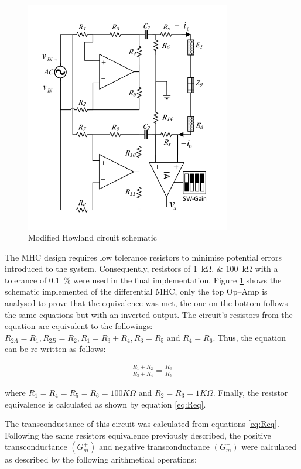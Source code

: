 \begin{figure}[!htpb]
	\centering
	\includegraphics[width=9cm,keepaspectratio]{figure3}  
    \caption{Modified Howland circuit schematic}
    \label{fig:mhc}
\end{figure}

The MHC design requires low tolerance resistors to minimise potential errors introduced to the system. Consequently, resistors of \SIlist{1;100}{\kohm} with a tolerance of \SI{0.1}{\percent} were used in the final implementation. Figure \ref{fig:mhc} shows the schematic implemented of the differential MHC, only the top Op–Amp is analysed to prove that the equivalence was met, the one on the bottom follows the same equations but with an inverted output. The circuit’s resistors from the equation are equivalent to the followings: $R_{2A}=R_1, R_{2B}=R_2, R_1 = R_3 + R_4, R_3 = R_5$ and $R_4 = R_6$. Thus, the equation can be re-written as follows: 

\begin{align}
\label{eq:Req}
\frac{R_1 + R_2}{R_3 + R_4} = \frac{R_6}{R_5}
\end{align}

where $R_1=R_4=R_5=R_6=100K\Omega$ and $R_2=R_3=1K\Omega$. Finally, the resistor equivalence is calculated as shown by equation \ref{eq:Req}. 

The transconductance of this circuit was calculated from equations \ref{eq:Req}. Following the same resistors equivalence previously described, the positive  transconductance $(G^+_m)$ and negative transconductance $(G^-_m)$ were calculated as described by the following arithmetical operations:


